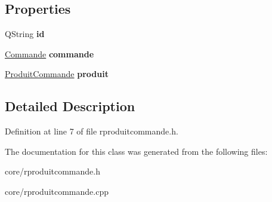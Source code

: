 \subsection*{Properties}
\begin{DoxyCompactItemize}
\item 
\hypertarget{class_r_produit_commande_aee1502dcf1b6274ba9ba9eddc566287a}{
QString {\bfseries id}}
\label{class_r_produit_commande_aee1502dcf1b6274ba9ba9eddc566287a}

\item 
\hypertarget{class_r_produit_commande_afc8ba2f88d481530c8a48fa3dd9b8f23}{
\hyperlink{class_commande}{Commande} {\bfseries commande}}
\label{class_r_produit_commande_afc8ba2f88d481530c8a48fa3dd9b8f23}

\item 
\hypertarget{class_r_produit_commande_a0957df5d3d85b00fa5da1867b2151929}{
\hyperlink{class_produit_commande}{ProduitCommande} {\bfseries produit}}
\label{class_r_produit_commande_a0957df5d3d85b00fa5da1867b2151929}

\end{DoxyCompactItemize}


\subsection{Detailed Description}


Definition at line 7 of file rproduitcommande.h.



The documentation for this class was generated from the following files:\begin{DoxyCompactItemize}
\item 
core/rproduitcommande.h\item 
core/rproduitcommande.cpp\end{DoxyCompactItemize}
